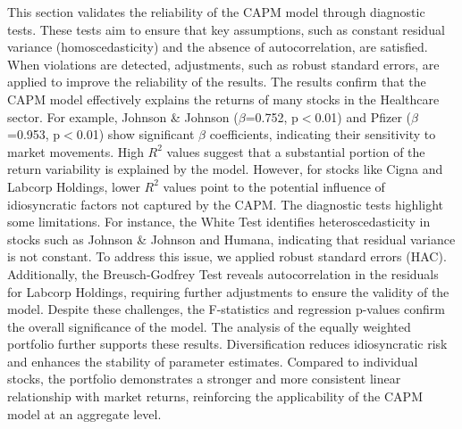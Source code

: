 This section validates the reliability of the CAPM model through diagnostic tests. 
These tests aim to ensure that key assumptions, such as constant residual variance (homoscedasticity) and the absence of 
autocorrelation, are satisfied. When violations are detected, adjustments, such as robust standard errors, are applied to 
improve the reliability of the results.
The results confirm that the CAPM model effectively explains the returns of many stocks in the Healthcare sector. 
For example, Johnson \& Johnson ($\beta$=0.752, p$<$0.01) and Pfizer ($\beta$=0.953, p$<$0.01) show significant $\beta$
coefficients, indicating their sensitivity to market movements.
High $R^2$ values suggest that a substantial portion of the return variability is explained by the model.
However, for stocks like Cigna and Labcorp Holdings, lower $R^2$ values point to the potential influence of idiosyncratic 
factors not captured by the CAPM.
The diagnostic tests highlight some limitations. For instance, the White Test identifies heteroscedasticity in stocks such as 
Johnson \& Johnson and Humana, indicating that residual variance is not constant. 
To address this issue, we applied robust standard errors (HAC). 
Additionally, the Breusch-Godfrey Test reveals autocorrelation in the residuals for Labcorp Holdings, requiring further 
adjustments to ensure the validity of the model. 
Despite these challenges, the F-statistics and regression p-values confirm the overall significance of the model.
The analysis of the equally weighted portfolio further supports these results. 
Diversification reduces idiosyncratic risk and enhances the stability of parameter estimates. 
Compared to individual stocks, the portfolio demonstrates a stronger and more consistent linear relationship with market 
returns, reinforcing the applicability of the CAPM model at an aggregate level.

